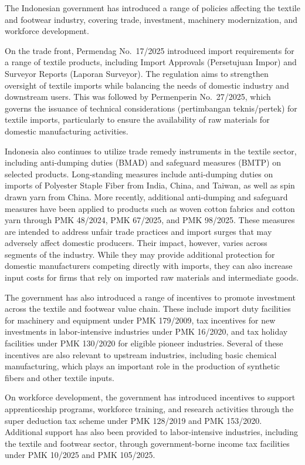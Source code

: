\documentclass[
  manuscript=article,
  layout=publish,
  year=2026,
  volume=1,
]{den}
\begin{document}
The Indonesian government has introduced a range of policies affecting
the textile and footwear industry, covering trade, investment, machinery
modernization, and workforce development.

On the trade front, Permendag No.~17/2025 introduced import requirements
for a range of textile products, including Import Approvals (Persetujuan
Impor) and Surveyor Reports (Laporan Surveyor). The regulation aims to
strengthen oversight of textile imports while balancing the needs of
domestic industry and downstream users. This was followed by Permenperin
No.~27/2025, which governs the issuance of technical considerations
(pertimbangan teknis/pertek) for textile imports, particularly to ensure
the availability of raw materials for domestic manufacturing activities.

Indonesia also continues to utilize trade remedy instruments in the
textile sector, including anti-dumping duties (BMAD) and safeguard
measures (BMTP) on selected products. Long-standing measures include
anti-dumping duties on imports of Polyester Staple Fiber from India,
China, and Taiwan, as well as spin drawn yarn from China. More recently,
additional anti-dumping and safeguard measures have been applied to
products such as woven cotton fabrics and cotton yarn through PMK
48/2024, PMK 67/2025, and PMK 98/2025. These measures are intended to
address unfair trade practices and import surges that may adversely
affect domestic producers. Their impact, however, varies across segments
of the industry. While they may provide additional protection for
domestic manufacturers competing directly with imports, they can also
increase input costs for firms that rely on imported raw materials and
intermediate goods.

The government has also introduced a range of incentives to promote
investment across the textile and footwear value chain. These include
import duty facilities for machinery and equipment under PMK 179/2009,
tax incentives for new investments in labor-intensive industries under
PMK 16/2020, and tax holiday facilities under PMK 130/2020 for eligible
pioneer industries. Several of these incentives are also relevant to
upstream industries, including basic chemical manufacturing, which plays
an important role in the production of synthetic fibers and other
textile inputs.

On workforce development, the government has introduced incentives to
support apprenticeship programs, workforce training, and research
activities through the super deduction tax scheme under PMK 128/2019 and
PMK 153/2020. Additional support has also been provided to
labor-intensive industries, including the textile and footwear sector,
through government-borne income tax facilities under PMK 10/2025 and PMK
105/2025.
\end{document}
